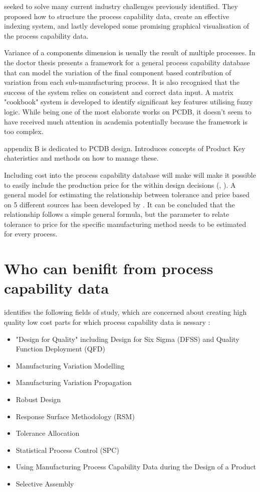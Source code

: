 \documentclass[aip,amsmath,reprint, author-year]{revtex4-1}
\begin{document}
\cite{thornton2000use} seeked to solve many current industry challenges previously identified. 
They proposed how to structure the process capability data, create an effective indexing system, and lastly developed some promising graphical visualisation of the process capability data. 

Variance of a components dimension is usually the result of multiple processes. 
In the doctor thesis \citet{kern2003forecasting} presents a framework for a general process capability database that can model the variation of the final component based contribution of variation from each sub-manufacturing process. 
It is also recognised that the success of the system relies on consistent and correct data input. 
A matrix "cookbook" system is developed to identify significant key features utilising fuzzy logic. 
While being one of the most elaborate works on PCDB, it doesn't seem to have received much attention in academia potentially because the framework is too complex.

\citet{thornton2004variation} appendix B is dedicated to PCDB design. Introduces concepts of Product Key chateristics and methods on how to manage these.

Including cost into the process capability database will make will make it possible to easily include the production price for the within design decisions (\cite{perzyk1998selection}, \cite{thornton2000use}). 
A general model for estimating the relationship between tolerance and price based on 5 different sources has been developed by \citet{sfantsikopoulos1990cost}.
It can be concluded that the relationship follows a simple general formula, but the parameter to relate tolerance to price for the specific manufacturing method needs to be estimated for every process. 

\section{Who can benifit from process capability data}

\citet{kern2003forecasting} identifies the following fields of study, which are concerned about creating high quality low cost parts for which process capability data is nessary : 
\begin{itemize}
\item "Design for Quality" including Design for Six Sigma (DFSS) and Quality Function Deployment (QFD)
\item Manufacturing Variation Modelling
\item Manufacturing Variation Propagation
\item Robust Design
\item Response Surface Methodology (RSM)
\item Tolerance Allocation
\item Statistical Process Control (SPC)
\item Using Manufacturing Process Capability Data during the Design of a Product
\item Selective Assembly
\end{itemize}
\end{document}
